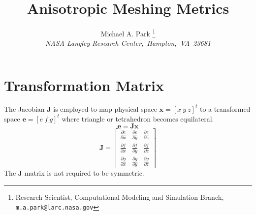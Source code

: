 \documentclass{article}
\title{Anisotropic Meshing Metrics}
\author{Michael A. Park
  \thanks{Research Scientist, Computational Modeling and Simulation Branch,
          \texttt{m.a.park@larc.nasa.gov}} \\
  {\itshape NASA Langley Research Center,~Hampton,~VA~23681}\\[5pt]
}
\begin{document}
\maketitle 

\section{Transformation Matrix}

The Jacobian $\mathbf{J}$ is employed to map physical space
$\mathbf{x}=\left[x ~y~z\right]^t$ to a transformed space
$\mathbf{e}=\left[e~f~g\right]^t$ where triangle or tetrahedron
becomes equilateral.
\begin{equation}\label{e:x}
 \mathbf{e}=\mathbf{J}\mathbf{x}
\end{equation}
\begin{equation}
 \mathbf{J}=\left[
 \begin{array}{ccc}
   \frac{\partial e}{\partial x}&
   \frac{\partial e}{\partial y}&
   \frac{\partial e}{\partial z}\\
   \frac{\partial f}{\partial x}&
   \frac{\partial f}{\partial y}&
   \frac{\partial f}{\partial z}\\
   \frac{\partial g}{\partial x}&
   \frac{\partial g}{\partial y}&
   \frac{\partial g}{\partial z}
 \end{array}\right]
\end{equation}
The $\mathbf{J}$ matrix is not required to be symmetric.
\end{document}
